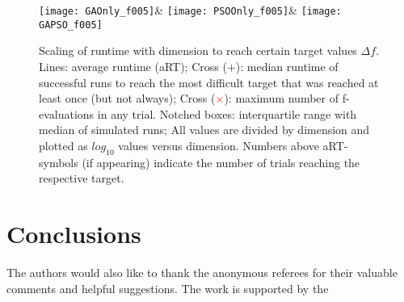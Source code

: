 \begin{figure*}[h!tb]
\begin{tabular}
    \texttt{[image: GAOnly\_f005]}&
    \texttt{[image: PSOOnly\_f005]}&
    \texttt{[image: GAPSO\_f005]}\\
    \end{tabular}
    \vspace{-3ex}
     \caption{
 Scaling of runtime with dimension to reach certain target values $\Delta f$. Lines:
 average runtime (aRT); Cross ($+$): median runtime of successful runs to reach
 the most difficult target that was reached at least once (but not always);
 Cross (\textcolor{red}{$\times$}): maximum number of f-evaluations in any trial. Notched boxes:
 interquartile range with median of simulated runs; All values are divided by
 dimension and plotted as $log_{10}$ values versus dimension. 
 Numbers above aRT-symbols
 (if appearing) indicate the number of trials reaching the respective target.
 }
\end{figure*}




\section{Conclusions}
\label{conclusions}

\begin{acks}

  The authors would also like to thank the anonymous referees for
  their valuable comments and helpful suggestions. The work is
  supported by the 
\end{acks}
